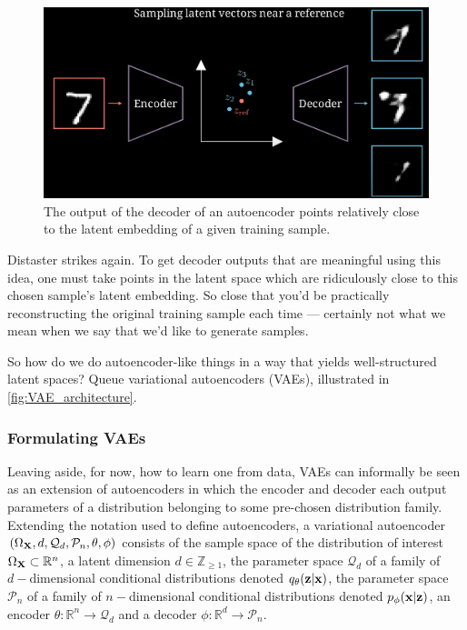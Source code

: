 \documentclass[11pt]{article}
\begin{document}
\begin{figure}[ht]
    \centering
    \includegraphics[width=0.75\columnwidth]{./figures/generative_models/AE_gen_2.png}
    \caption{The output of the decoder of an autoencoder points relatively close to the latent embedding of a given training sample.}
    \label{fig:autoencoder_generation_2}
\end{figure}

\noindent Distaster strikes again. To get decoder outputs that are meaningful using this idea, one must take points in the latent space which are ridiculously close to this chosen sample's latent embedding. So close that you'd be practically reconstructing the original training sample each time — certainly not what we mean when we say that we'd like to generate samples.

So how do we do autoencoder-like things in a way that yields well-structured latent spaces? Queue variational autoencoders (VAEs), illustrated in \autoref{fig:VAE_architecture}.

\subsubsection{Formulating VAEs}
Leaving aside, for now, how to learn one from data, VAEs can informally be seen as an extension of autoencoders in which the encoder and decoder each output parameters of a distribution belonging to some pre-chosen distribution family. Extending the notation used to define autoencoders, a variational autoencoder $(\Omega_{\mathbf{X}},d,\mathcal{Q}_d,\mathcal{P}_n,\theta,\phi)$ consists of the sample space of the distribution of interest $\Omega_{\mathbf{X}}\subset\mathbb{R}^n$, a latent dimension $d\in\mathbb{Z}_{\geq1}$, the parameter space $\mathcal{Q}_d$ of a family of $d-$dimensional conditional distributions denoted $q_{\theta}(\mathbf{z}|\mathbf{x})$, the parameter space $\mathcal{P}_n$ of a family of $n-$dimensional conditional distributions denoted $p_{\phi}(\mathbf{x}|\mathbf{z})$, an encoder $\theta:\mathbb{R}^n\to\mathcal{Q}_d$ and a decoder $\phi:\mathbb{R}^d\to\mathcal{P}_n$.
\end{document}
